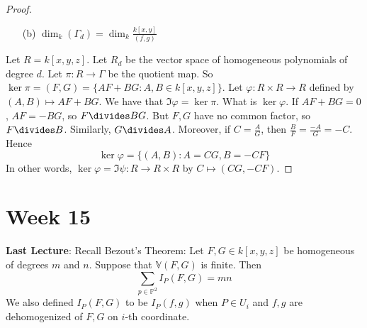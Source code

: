 \documentclass{report}
\begin{document}
\begin{proof}
\begin{itemize}
                \item [(b)] $\dim_{k}(\Gamma_{d}) = \dim_{k}\frac{k[x, y]}{(f, g)}$ 
            \end{itemize}
        Let $R = k[x, y, z]$. Let $R_{d}$ be the vector space of homogeneous polynomials of degree $d$. Let $\pi : R \rightarrow \Gamma$ be the quotient map. So $\ker{\pi} = (F, G) = \{AF + BG : A, B \in k[x, y, z]\}$. Let $\varphi : R \times R \rightarrow R$ defined by $(A, B) \mapsto AF + BG$. We have that $ \Im{\varphi} = \ker{\pi}$. What is $\ker{\varphi}$. If $AF + BG = 0$, $AF = -BG$, so $F \divides BG$. But $F, G$ have no common factor, so $F \divides B$. Similarly, $G \divides A$. Moreover, if $C = \frac{A}{G}$, then $\frac{B}{F} = \frac{-A}{G} = -C$. Hence
            \begin{equation*}
                \ker{\varphi} = \{(A, B) : A = CG, B = -CF\}
            \end{equation*}
        In other words, $\ker{\varphi} = \Im{\psi} : R \rightarrow R \times R$ by $C \mapsto (CG, - CF)$.
    \end{proof}

\chapter{Week 15}

\textbf{Last Lecture}: Recall Bezout's Theorem: Let $F, G \in k[ x, y, z]$ be homogeneous of degrees $m$ and $n$. Suppose that $\mathbb{V}(F, G)$ is finite. Then
    \begin{equation*}
        \sum_{ p \in \mathbb{P}^{2}} I_{P}(F, G) = mn
    \end{equation*}
We also defined $I_{P}(F, G)$ to be $I_{P}(f, g)$ when $P \in U_{ i}$ and $f, g$ are dehomogenized of $F, G$ on $i$-th coordinate.
\end{document}
